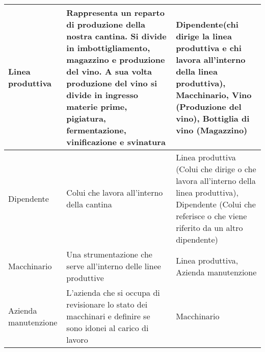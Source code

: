\begin{center}
\begin{tabular}{P{2cm}P{8cm}P{4cm}}
		\midrule
		Linea produttiva & Rappresenta un reparto di produzione della nostra cantina. Si divide in imbottigliamento, magazzino e produzione del vino. A sua volta produzione del vino si divide in ingresso materie prime, pigiatura, fermentazione, vinificazione e svinatura &  Dipendente(chi dirige la linea produttiva e chi lavora all'interno della linea produttiva), Macchinario, Vino (Produzione del vino), Bottiglia di vino (Magazzino)\\
		\midrule
		Dipendente & Colui che lavora all'interno della cantina &  Linea produttiva (Colui che dirige o che lavora all'interno della linea produttiva), Dipendente (Colui che referisce o che viene riferito da un altro dipendente)\\
		\midrule
		Macchinario & Una strumentazione che serve all'interno delle linee produttive &  Linea produttiva, Azienda manutenzione\\
		\midrule
		Azienda manutenzione & L'azienda che si occupa di revisionare lo stato dei macchinari e definire se sono idonei al carico di lavoro &  Macchinario\\
		\bottomrule
	\end{tabular}
\end{center}